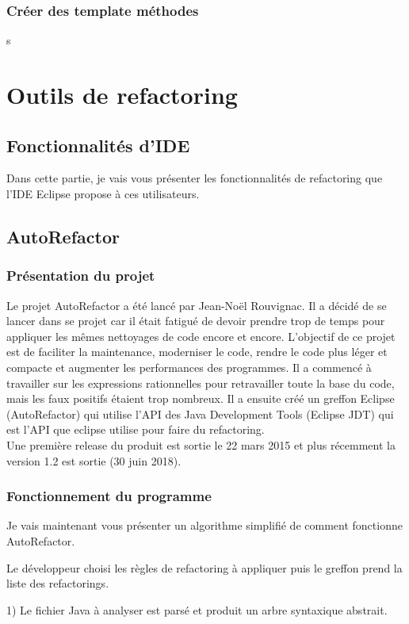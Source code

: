 \documentclass[a4paper,twoside,12pt,openright]{report}
\begin{document}
\subsection{Créer des template méthodes}
s

\chapter{Outils de refactoring}
\section{Fonctionnalités d'IDE}
Dans cette partie, je vais vous présenter les fonctionnalités de refactoring que l'IDE Eclipse propose à ces utilisateurs.


\section{AutoRefactor}
\subsection{Présentation du projet}
Le projet AutoRefactor a été lancé par Jean-Noël Rouvignac. Il a décidé de se lancer dans se projet car il était fatigué de devoir prendre trop de temps pour appliquer les mêmes nettoyages de code encore et encore. L'objectif de ce projet est de faciliter la maintenance, moderniser le code, rendre le code plus léger et compacte et augmenter les performances des programmes. Il a commencé à travailler sur les expressions rationnelles pour retravailler toute la base du code, mais les faux positifs étaient trop nombreux.\cite{ref7} Il a ensuite créé un greffon Eclipse (AutoRefactor) qui utilise  l'API des Java Development Tools (Eclipse JDT) qui est l'API que eclipse utilise pour faire du refactoring.\\
Une première release du produit est sortie le 22 mars 2015 et plus récemment la version 1.2 est sortie (30 juin 2018).

\subsection{Fonctionnement du programme}
Je vais maintenant vous présenter un algorithme simplifié de comment fonctionne AutoRefactor.

Le développeur choisi les règles de refactoring à appliquer puis le greffon prend la liste des refactorings.

1) Le fichier Java à analyser est parsé et produit un arbre syntaxique abstrait.\\
\end{document}
